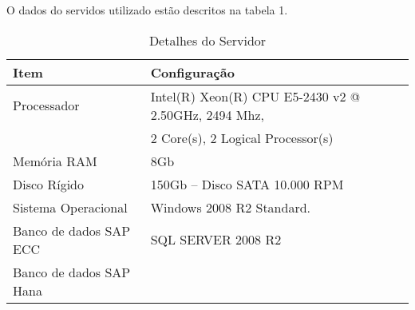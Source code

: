O dados do servidos utilizado estão descritos na tabela 1.
\begin{table}[H]
\centering
\caption{Detalhes do Servidor}
\label{DetalhesServidor}
\begin{tabular}{|l|l|}
\hline
Item                    & Configuração                                                                           \\ \hline
Processador             & Intel(R) Xeon(R) CPU E5-2430 v2 @ 2.50GHz, 2494 Mhz, \\ & 
						  2 Core(s), 2 Logical Processor(s) \\ \hline
Memória RAM             & 8Gb                                                                                    \\ \hline
Disco Rígido            & 150Gb – Disco SATA 10.000   RPM                                                        \\ \hline
Sistema Operacional     & Windows 2008 R2 Standard.                                                              \\ \hline
Banco de dados SAP ECC  & SQL SERVER 2008 R2                                                                     \\ \hline
Banco de dados SAP Hana &                                                                                        \\ \hline
\end{tabular}
\end{table}








